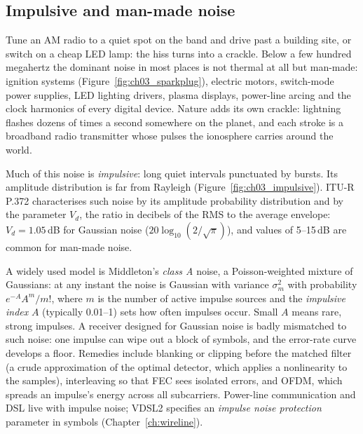 
\subsection{Impulsive and man-made noise}
\label{sec:ch03:impulsive}

Tune an AM radio to a quiet spot on the band and drive past a building site, or switch on a cheap LED
lamp: the hiss turns into a crackle. Below a few hundred megahertz the dominant noise in most places is
not thermal at all but man-made: ignition systems (Figure~\ref{fig:ch03_sparkplug}), electric motors,
switch-mode power supplies, LED lighting drivers, plasma displays, power-line arcing and the clock
harmonics of every digital device. Nature adds its own crackle: lightning flashes dozens of times
a second somewhere on the planet, and each stroke is a broadband radio transmitter whose pulses the
ionosphere carries around the world.

Much of this noise is \emph{impulsive}: long quiet intervals punctuated by bursts. Its amplitude
distribution is far from Rayleigh (Figure~\ref{fig:ch03_impulsive}). ITU-R P.372 characterises such
noise by its amplitude probability distribution and by the parameter $V_d$, the ratio in decibels of the
RMS to the average envelope: $V_d=1.05$\,dB for Gaussian noise ($20\log_{10}(2/\sqrt\pi)$), and values
of 5--15\,dB are common for man-made noise.

A widely used model is Middleton's \emph{class A} noise, a Poisson-weighted mixture of Gaussians: at any
instant the noise is Gaussian with variance $\sigma_m^2$ with probability $e^{-A}A^m/m!$, where $m$ is
the number of active impulse sources and the \emph{impulsive index} $A$ (typically 0.01--1) sets how
often impulses occur. Small $A$ means rare, strong impulses. A receiver designed for Gaussian noise is
badly mismatched to such noise: one impulse can wipe out a block of symbols, and the error-rate curve
develops a floor. Remedies include blanking or clipping before the matched filter (a crude approximation
of the optimal detector, which applies a nonlinearity to the samples), interleaving so that FEC sees
isolated errors, and OFDM, which spreads an impulse's energy across all subcarriers. Power-line
communication and DSL live with impulse noise; VDSL2 specifies an \emph{impulse noise protection}
parameter in symbols (Chapter~\ref{ch:wireline}).

